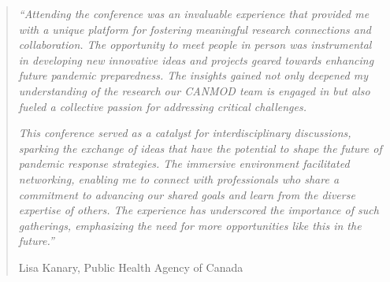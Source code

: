 \begin{quote}
\textit{``Attending the conference was an invaluable experience that provided me with a unique platform for fostering meaningful research connections and collaboration.  The opportunity to meet people in person was instrumental in developing new innovative ideas and projects geared towards enhancing future pandemic preparedness. The insights gained not only deepened my understanding of the research our CANMOD team is engaged in but also fueled a collective passion for addressing critical challenges.}

\textit{This conference served as a catalyst for interdisciplinary discussions, sparking the exchange of ideas that have the potential to shape the future of pandemic response strategies. The immersive environment facilitated networking, enabling me to connect with professionals who share a commitment to advancing our shared goals and learn from the diverse expertise of others. The experience has underscored the importance of such gatherings, emphasizing the need for more opportunities like this in the future.''}

\hfill Lisa Kanary, Public Health Agency of Canada
\end{quote}
